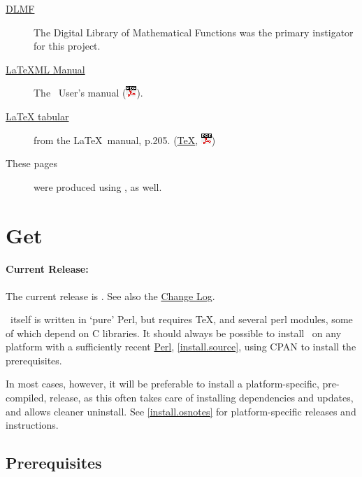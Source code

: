 \documentclass{article}
\newcommand{\PDFIcon}{\includegraphics{pdf}}
\begin{document}
\begin{description}
\item[\href{http://dlmf.nist.gov/contents/}{DLMF}]
   The Digital Library of Mathematical Functions was the
   primary instigator for this project.
\item[\href{manual/}{LaTeXML Manual}]
   The \LaTeXML\ User's manual (\href{manual.pdf}{\PDFIcon}).
\item[\href{examples/tabular/tabular.html}{LaTeX tabular}]
    from the \LaTeX\ manual, p.205.
    (\href{examples/tabular/tabular.tex}{\TeX},
     \href{examples/tabular/tabular.pdf}{\PDFIcon})
\item[These pages] were produced using \LaTeXML, as well.
\end{description}


\section{Get \LaTeXML}\label{get}
\paragraph{Current Release:}\label{download.current}
The current release is \textbf{\CurrentVersion}.
See also the \href{Changes}{Change Log}.


\LaTeXML\ itself is written in `pure' Perl, but requires \TeX,
and several perl modules, some of which depend on C libraries.
It should always be possible to install \LaTeXML\ on any platform
with a sufficiently recent \href{http://www.perl.org/}{Perl},
\ref{install.source}, using CPAN to install the prerequisites.

In most cases, however, it will be preferable to install
a platform-specific, pre-compiled, release, as this often
takes care of installing dependencies and updates,
and allows cleaner uninstall.  See  \ref{install.osnotes} for
platform-specific releases and instructions.

\subsection{Prerequisites}
\end{document}
